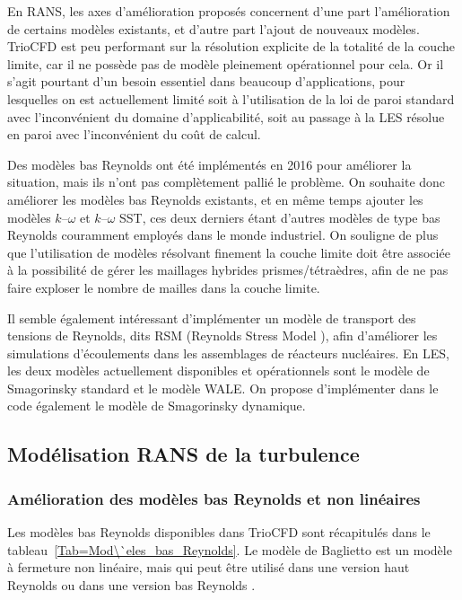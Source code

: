En RANS, les axes d'am\'elioration propos\'es concernent d'une part l'am\'elioration de certains mod\`eles existants, et d'autre part l'ajout de nouveaux mod\`eles. TrioCFD est peu performant sur la r\'esolution explicite de la totalit\'e de la couche limite, car il ne poss\`ede pas de mod\`ele pleinement op\'erationnel pour cela. 
Or il s'agit pourtant d'un besoin essentiel dans beaucoup d'applications, pour lesquelles on est actuellement limit\'e soit \`a l'utilisation de la loi de paroi standard avec l'inconv\'enient du domaine d'applicabilit\'e, soit au passage \`a la LES r\'esolue en paroi avec l'inconv\'enient du co\^ut de calcul. 

Des mod\`eles bas Reynolds ont \'et\'e impl\'ement\'es en 2016 pour am\'eliorer la situation, mais ils n'ont pas compl\`etement palli\'e le probl\`eme. On souhaite donc am\'eliorer les mod\`eles bas Reynolds existants, et en m\^eme temps ajouter les mod\`eles $k$--$\omega$ et $k$--$\omega$ SST, ces deux derniers \'etant d'autres mod\`eles de type bas Reynolds couramment employ\'es dans le monde industriel. On souligne de plus que l'utilisation de mod\`eles r\'esolvant finement la couche limite doit \^etre associ\'ee \`a la possibilit\'e de g\'erer les maillages hybrides prismes/t\'etra\`edres, afin de ne pas faire exploser le nombre de mailles dans la couche limite.

Il semble \'egalement int\'eressant d'impl\'ementer un mod\`ele de transport des tensions de Reynolds, dits RSM ({\og Reynolds Stress Model \fg}), afin d'am\'eliorer les simulations d'\'ecoulements dans les assemblages de r\'eacteurs nucl\'eaires.
En LES, les deux mod\`eles actuellement disponibles et op\'erationnels sont le mod\`ele de Smagorinsky standard et le mod\`ele WALE. On propose d'impl\'ementer dans le code \'egalement le mod\`ele de Smagorinsky dynamique.


\subsection{Mod\'elisation RANS de la turbulence}
\label{section-RANS}

\subsubsection{Am\'elioration des mod\`eles bas Reynolds et non lin\'eaires}
\label{Subsection=Bas_Reynolds}

Les mod\`eles bas Reynolds disponibles dans TrioCFD sont r\'ecapitul\'es dans le tableau~\ref{Tab=Mod\`eles_bas_Reynolds}. Le mod\`ele de Baglietto est un mod\`ele \`a fermeture non lin\'eaire, mais qui peut \^etre utilis\'e dans une version {\og haut Reynolds \fg} ou dans une version {\og bas Reynolds \fg}.


